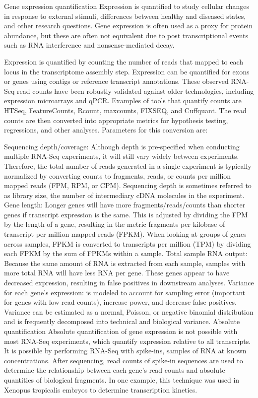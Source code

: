 Gene expression quantification
Expression is quantified to study cellular changes in response to external stimuli, differences between healthy and diseased states, and other research questions. Gene expression is often used as a proxy for protein abundance, but these are often not equivalent due to post transcriptional events such as RNA interference and nonsense-mediated decay.

Expression is quantified by counting the number of reads that mapped to each locus in the transcriptome assembly step. Expression can be quantified for exons or genes using contigs or reference transcript annotations. These observed RNA-Seq read counts have been robustly validated against older technologies, including expression microarrays and qPCR. Examples of tools that quantify counts are HTSeq, FeatureCounts, Rcount, maxcounts, FIXSEQ, and Cuffquant. The read counts are then converted into appropriate metrics for hypothesis testing, regressions, and other analyses. Parameters for this conversion are:

Sequencing depth/coverage: Although depth is pre-specified when conducting multiple RNA-Seq experiments, it will still vary widely between experiments. Therefore, the total number of reads generated in a single experiment is typically normalized by converting counts to fragments, reads, or counts per million mapped reads (FPM, RPM, or CPM). Sequencing depth is sometimes referred to as library size, the number of intermediary cDNA molecules in the experiment.
Gene length: Longer genes will have more fragments/reads/counts than shorter genes if transcript expression is the same. This is adjusted by dividing the FPM by the length of a gene, resulting in the metric fragments per kilobase of transcript per million mapped reads (FPKM). When looking at groups of genes across samples, FPKM is converted to transcripts per million (TPM) by dividing each FPKM by the sum of FPKMs within a sample.
Total sample RNA output: Because the same amount of RNA is extracted from each sample, samples with more total RNA will have less RNA per gene. These genes appear to have decreased expression, resulting in false positives in downstream analyses.
Variance for each gene's expression: is modeled to account for sampling error (important for genes with low read counts), increase power, and decrease false positives. Variance can be estimated as a normal, Poisson, or negative binomial distribution and is frequently decomposed into technical and biological variance.
Absolute quantification
Absolute quantification of gene expression is not possible with most RNA-Seq experiments, which quantify expression relative to all transcripts. It is possible by performing RNA-Seq with spike-ins, samples of RNA at known concentrations. After sequencing, read counts of spike-in sequences are used to determine the relationship between each gene's read counts and absolute quantities of biological fragments. In one example, this technique was used in Xenopus tropicalis embryos to determine transcription kinetics.

